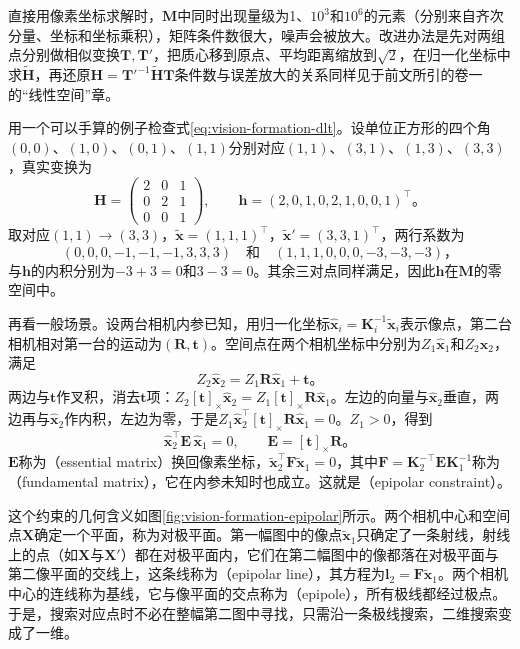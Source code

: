 直接用像素坐标求解时，$\bm M$中同时出现量级为1、$10^3$和$10^6$的元素（分别来自齐次分量、坐标和坐标乘积），矩阵条件数很大，噪声会被放大。改进办法是先对两组点分别做相似变换$\bm T,\bm T'$，把质心移到原点、平均距离缩放到$\sqrt2$，在归一化坐标中求$\tilde{\bm H}$，再还原$\bm H=\bm T'^{-1}\tilde{\bm H}\bm T$条件数与误差放大的关系同样见于前文所引的卷一的“线性空间”章。

用一个可以手算的例子检查式\eqref{eq:vision-formation-dlt}。设单位正方形的四个角$(0,0)$、$(1,0)$、$(0,1)$、$(1,1)$分别对应$(1,1)$、$(3,1)$、$(1,3)$、$(3,3)$，真实变换为
\[
  \bm H=\begin{pmatrix}2&0&1\\0&2&1\\0&0&1\end{pmatrix},\qquad
  \bm h=(2,0,1,0,2,1,0,0,1)^\top\text{。}
\]
取对应$(1,1)\to(3,3)$，$\tilde{\bm x}=(1,1,1)^\top$，$\tilde{\bm x}'=(3,3,1)^\top$，两行系数为
\[
  (0,0,0,-1,-1,-1,3,3,3)\quad\text{和}\quad(1,1,1,0,0,0,-3,-3,-3)\text{，}
\]
与$\bm h$的内积分别为$-3+3=0$和$3-3=0$。其余三对点同样满足，因此$\bm h$在$\bm M$的零空间中。

再看一般场景。设两台相机内参已知，用归一化坐标$\hat{\bm x}_i=\bm K_i^{-1}\tilde{\bm x}_i$表示像点，第二台相机相对第一台的运动为$(\bm R,\bm t)$。空间点在两个相机坐标中分别为$Z_1\hat{\bm x}_1$和$Z_2\hat{\bm x}_2$，满足
\[
  Z_2\hat{\bm x}_2=Z_1\bm R\hat{\bm x}_1+\bm t\text{。}
\]
两边与$\bm t$作叉积，消去$\bm t$项：$Z_2[\bm t]_\times\hat{\bm x}_2=Z_1[\bm t]_\times\bm R\hat{\bm x}_1$。左边的向量与$\hat{\bm x}_2$垂直，两边再与$\hat{\bm x}_2$作内积，左边为零，于是$Z_1\hat{\bm x}_2^\top[\bm t]_\times\bm R\hat{\bm x}_1=0$。$Z_1>0$，得到
\begin{equation}
  \hat{\bm x}_2^\top\bm E\,\hat{\bm x}_1=0,\qquad \bm E=[\bm t]_\times\bm R\text{。}
  \label{eq:vision-formation-essential}
\end{equation}
$\bm E$称为（essential matrix）换回像素坐标，$\tilde{\bm x}_2^\top\bm F\tilde{\bm x}_1=0$，其中$\bm F=\bm K_2^{-\top}\bm E\bm K_1^{-1}$称为（fundamental matrix），它在内参未知时也成立。这就是（epipolar constraint）。

这个约束的几何含义如图\ref{fig:vision-formation-epipolar}所示。两个相机中心和空间点$\bm X$确定一个平面，称为对极平面。第一幅图中的像点$\tilde{\bm x}_1$只确定了一条射线，射线上的点（如$\bm X$与$\bm X'$）都在对极平面内，它们在第二幅图中的像都落在对极平面与第二像平面的交线上，这条线称为（epipolar line），其方程为$\bm l_2=\bm F\tilde{\bm x}_1$。两个相机中心的连线称为基线，它与像平面的交点称为（epipole），所有极线都经过极点。于是，搜索对应点时不必在整幅第二图中寻找，只需沿一条极线搜索，二维搜索变成了一维。

